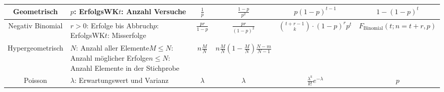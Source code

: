 \begin{fontsize}{10}{13}
{\begin{tabular}{||c|p{3.3cm}|*{4}{c|}|}
			Geometrisch                                                  & $p$: ErfolgsWK\newline$t$: Anzahl Versuche                               & $\frac{1}{p}$                       & $\frac{1-p}{p^2}$                 &
			$p(1-p)^{t-1}$                                               & $1-(1-p)^t$                                                                                                                                                                                                  \\
			\hline

			Negativ Binomial                                             & $r>0$: Erfolge bis Abbruch\newline$p$: ErfolgsWK\newline$t$: Misserfolge &
			$\frac{pr}{1-p}$                                             & $\frac{pr}{(1-p)^2}$                                                     & $\binom{t+r-1}{k} \cdot (1-p)^rp^t$ &
			$F_{\text{Binomial}}(t;n=t+r,p)$                                                                                                                                                                                                                                            \\
			\hline

			Hypergeometrisch                                             & $N$: Anzahl aller Elemente\newline$M \leq N$: Anzahl möglicher
			Erfolge\newline$n \leq N$: Anzahl Elemente in der Stichprobe & $n\frac{M}{N}$                                                           &
			$n\frac{M}{N}\left(1-\frac{M}{N}\right)\frac{N-m}{N-1}$
			                                                             & \raisebox{-5pt}{$\frac{\binom{M}{t}\binom{N-M}{n-t}}{\binom{N}{n}}$}     &
			\raisebox{-5pt}{$\sum_{k=0}^{t}\frac{\binom{M}{k}\binom{N-M}{n-k}}{\binom{N}{n}}$}                                                                                                                                                                                          \\
			\hline

			Poisson                                                      & $\lambda$: Erwartungswert und Varianz                                    & $\lambda$                           & $\lambda$                         &
			$\frac{\lambda^k}{k!}e^{-\lambda}$                           & $p$                                                                                                                                                                                                          \\
			\hline
		\end{tabular}}

\end{fontsize}

